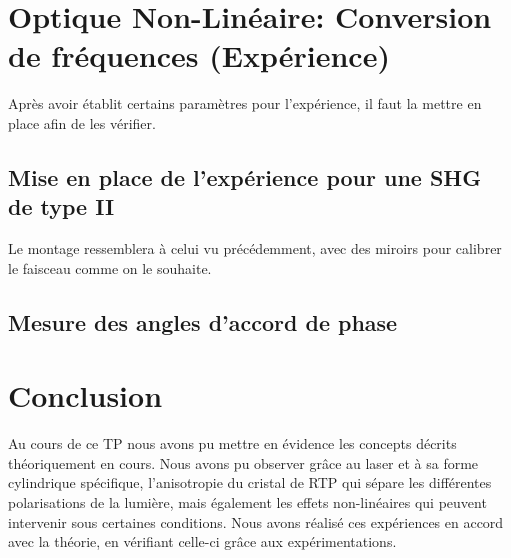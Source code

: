 \documentclass[a4paper,11pt]{report}
\begin{document}
\chapter{Optique Non-Linéaire: Conversion de fréquences (Expérience)} \label{ONLExp}
Après avoir établit certains paramètres pour l'expérience, il faut la mettre en place afin de les vérifier.
\section{Mise en place de l'expérience pour une SHG de type II}
Le montage ressemblera à celui vu précédemment, avec des miroirs pour calibrer le faisceau comme on le souhaite. 

\section{Mesure des angles d'accord de phase}

\chapter*{Conclusion} 
Au cours de ce TP nous avons pu mettre en évidence les concepts décrits théoriquement en cours. Nous avons pu observer grâce au laser et à sa forme cylindrique spécifique, l'anisotropie du cristal de RTP qui sépare les différentes polarisations de la lumière, mais également les effets non-linéaires qui peuvent intervenir sous certaines conditions. Nous avons réalisé ces expériences en accord avec la théorie, en vérifiant celle-ci grâce aux expérimentations.
\end{document}
